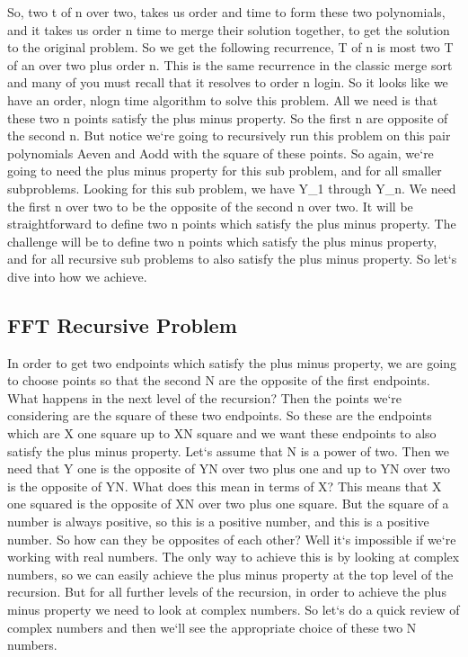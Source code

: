 So, two t of n over two, takes us order and time to form these two polynomials, and it takes us order n time to merge their solution together, to get the solution to the original problem.
So we get the following recurrence, T of n is most two T of an over two plus order n.
This is the same recurrence in the classic merge sort and many of you must recall that it resolves to order n login.
So it looks like we have an order, nlogn time algorithm to solve this problem.
All we need is that these two n points satisfy the plus minus property.
So the first n are opposite of the second n.
But notice we`re going to recursively run this problem on this pair polynomials Aeven and Aodd with the square of these points.
So again, we`re going to need the plus minus property for this sub problem, and for all smaller subproblems.
Looking for this sub problem, we have Y\_1 through Y\_n.
We need the first n over two to be the opposite of the second n over two.
It will be straightforward to define two n points which satisfy the plus minus property.
The challenge will be to define two n points which satisfy the plus minus property, and for all recursive sub problems to also satisfy the plus minus property.
So let`s dive into how we achieve.

\subsection{FFT  Recursive Problem}
In order to get two endpoints which satisfy the plus minus property, we are going to choose points so that the second N are the opposite of the first endpoints.
What happens in the next level of the recursion? Then the points we`re considering are the square of these two endpoints.
So these are the endpoints which are X one square up to XN square and we want these endpoints to also satisfy the plus minus property.
Let`s assume that N is a power of two.
Then we need that Y one is the opposite of YN over two plus one and up to YN over two is the opposite of YN\@.
What does this mean in terms of X? This means that X one squared is the opposite of XN over two plus one square.
But the square of a number is always positive, so this is a positive number, and this is a positive number.
So how can they be opposites of each other? Well it`s impossible if we`re working with real numbers.
The only way to achieve this is by looking at complex numbers, so we can easily achieve the plus minus property at the top level of the recursion.
But for all further levels of the recursion, in order to achieve the plus minus property we need to look at complex numbers.
So let`s do a quick review of complex numbers and then we`ll see the appropriate choice of these two N numbers.


